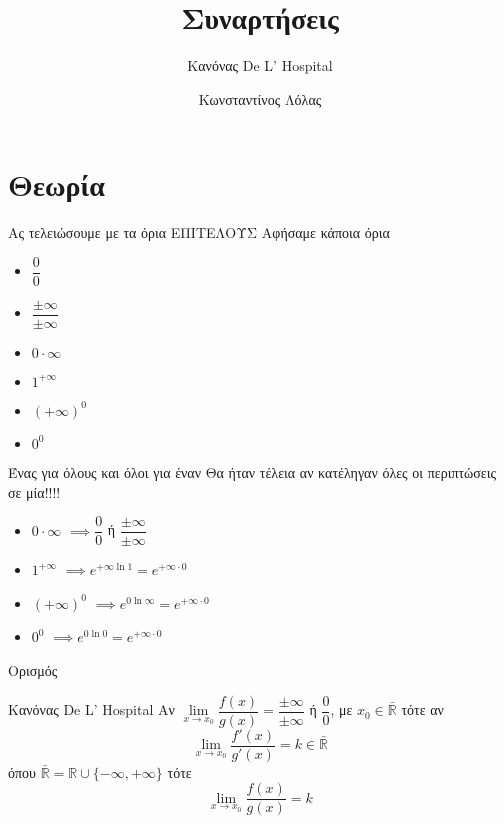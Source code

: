 \documentclass[greek]{beamer}
\title{Συναρτήσεις}
\subtitle{Κανόνας De L' Hospital}
\author[Λόλας]{Κωνσταντίνος Λόλας}
\date{}
\begin{document}
\begin{frame}
    \titlepage
\end{frame}

\section{Θεωρία}
\begin{frame}{Ας τελειώσουμε με τα όρια ΕΠΙΤΕΛΟΥΣ}
    Αφήσαμε κάποια όρια
    \begin{itemize}
        \item $\dfrac{0}{0}$
        \item $\dfrac{\pm\infty}{\pm\infty}$
        \item $0\cdot \infty$
        \item $1^{+\infty}$
        \item $(+\infty)^0$
        \item $0^0$
    \end{itemize}
\end{frame}

\begin{frame}{Ένας για όλους και όλοι για έναν}
    Θα ήταν τέλεια αν κατέληγαν όλες οι περιπτώσεις σε μία!!!!
    \begin{itemize}
        \item<1-> $0\cdot \infty$ $\implies \dfrac{0}{0}$ ή $\dfrac{\pm\infty}{\pm\infty}$
        \item<3-> $1^{+\infty}$  $\implies e^{+\infty\ln 1}=e^{+\infty\cdot 0}$
        \item<5-> $(+\infty)^0$  $\implies e^{0\ln\infty}=e^{+\infty\cdot 0}$
        \item<7-> $0^0$  $\implies e^{0\ln 0}=e^{+\infty\cdot 0}$
    \end{itemize}
\end{frame}

\begin{frame}{Ορισμός}
    \begin{block}{Κανόνας De L' Hospital}
        Αν $\lim\limits_{x \to x_0}{ \dfrac{f(x)}{g(x)} }=\dfrac{\pm\infty}{\pm\infty}$ ή $\dfrac{0}{0}$, με $x_0\in\bar{\mathbb{R}}$ τότε αν
        $$\lim\limits_{x \to x_0}{ \dfrac{f'(x)}{g'(x)} }=k\in\bar{\mathbb{R}}$$
        όπου $\bar{\mathbb{R}}=\mathbb{R}\cup \{-\infty,+\infty\}$ τότε
        $$\lim\limits_{x \to x_0}{ \dfrac{f(x)}{g(x)} }=k$$
    \end{block}
\end{frame}
\end{document}
